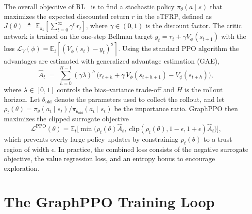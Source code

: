 \documentclass[journal]{IEEEtran}
\begin{document}
The overall objective of RL~\cite{SuttonReinforcementIntroduction} is to find a stochastic policy $\pi_\theta(a\mid s)$ that maximizes the expected discounted return $r$ in the eTFRP, defined as
$J(\theta)\;\triangleq\;\mathbb{E}_{\pi_\theta}\!\left[\sum_{t=0}^{\infty}\gamma^{t}\,r_t\right]$, where $\gamma\in(0,1)$ is the discount factor. 
The critic network is trained on the one-step Bellman target $y_t = r_t + \gamma V_\phi(s_{t+1})$ with the loss $\mathcal{L}_V(\phi)=\mathbb{E}_t[(V_\phi(s_t)-y_t)^2]$. Using the standard PPO algorithm the advantages are estimated with generalized advantage estimation (GAE),
\begin{equation}
\widehat{A}_t 
\;=\;
\sum_{h=0}^{H-1}(\gamma\lambda)^h\,\big( r_{t+h} + \gamma\,V_\phi(s_{t+h+1}) - V_\phi(s_{t+h}) \big),
\label{eq:gae}
\end{equation}
where $\lambda\in[0,1]$ controls the bias--variance trade-off and $H$ is the rollout horizon.
Let $\theta_{\mathrm{old}}$ denote the parameters used to collect the rollout, and let $\rho_t(\theta)=\pi_\theta(a_t\mid s_t)/\pi_{\theta_{\mathrm{old}}}(a_t\mid s_t)$ be the importance ratio. GraphPPO then maximizes the clipped surrogate objective
\begin{equation}
\mathcal{L}^{\mathrm{PPO}}(\theta)
=\mathbb{E}_t\Big[
\min\big(\rho_t(\theta)\widehat{A}_t,\ \mathrm{clip}(\rho_t(\theta),1-\epsilon,1+\epsilon)\widehat{A}_t\big)
\Big],
\label{eq:ppo_objective}
\end{equation}
which prevents overly large policy updates by constraining $\rho_t(\theta)$ to a trust region of width $\epsilon$. In practice, the combined loss consists of the negative surrogate objective, the value regression loss, and an entropy bonus to encourage exploration.

\section{The GraphPPO Training Loop}
\end{document}

